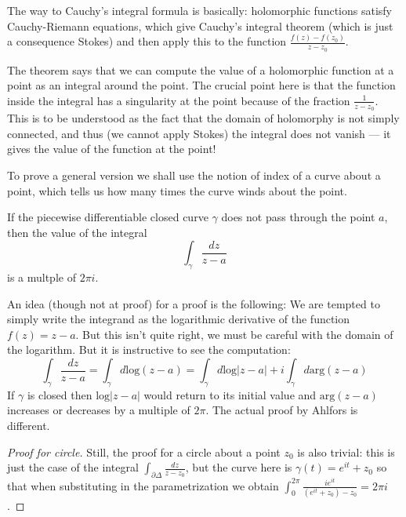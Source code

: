 \noindent
The way to Cauchy's integral formula is
basically:
holomorphic functions satisfy Cauchy-Riemann
equations,
which give Cauchy's integral theorem
(which is just a consequence Stokes)
and then apply this to the function
$\frac{f(z)-f(z_0)}{z-z_0}$.

The theorem says that we can compute the
value of
a holomorphic function at a point as an
integral around the point.
The crucial point here is that the function
inside the integral
has a singularity at the point because of the
fraction $\frac{1}{z-z_0}$.
This is to be understood as the fact
that the domain of holomorphy is not simply
connected, and thus
(we cannot apply Stokes) the integral does
not vanish ---
it gives the value of the function at the
point!

To prove a general version we shall use the
notion of index of a curve
about a point, which tells us how many times
the curve winds about the point.

\begin{lemma}
\label{lemma-index-is-multiple-of-2pii}
\begin{reference}
\cite[Section 2.2, Lemma 1]{ahl}
\end{reference}
If the piecewise differentiable closed curve
$\gamma$ does not pass through the
point $a$, then the value of the integral
$$
\int_\gamma\frac{dz}{z-a}
$$
is a multple of $2\pi i$.
\end{lemma}

An idea (though not at proof) for a proof is
the following:
We are tempted to simply write the integrand
as the logarithmic derivative of
the function $f(z)=z-a$. But this isn't quite
right, we must be careful with the
domain of the logarithm. But it is
instructive to see the computation:
$$
\int_\gamma\frac{dz}{z-a}=\int_\gamma d
\text{log}(z-a)=
\int_\gamma d\text{log}|z-a|+i\int_\gamma d
\text{arg}(z-a)
$$
If  $\gamma$ is closed then $\text{log}|z-a|$
would return to its initial value
and $\text{arg}(z-a)$ increases or decreases
by a multiple of $2\pi$. The actual
proof by Ahlfors is different.

\begin{proof}[Proof for circle]
Still, the proof for a circle about a point
$z_0$ is also trivial: this is just
the case of the integral
$\int_{\partial\Delta}\frac{dz}{z-z_0}$, but
the curve
here is  $\gamma(t)=e^{it}+z_0$ so that when
substituting in the parametrization
we obtain
$\int_0^{2\pi}\frac{ie^{it}}{(e^{it}+z_0)-
z_0}=2\pi
i$.
\end{proof}

